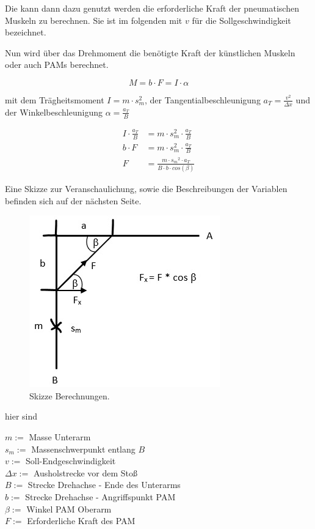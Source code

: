 Die kann dann dazu genutzt werden die erforderliche Kraft der pneumatischen Muskeln zu berechnen.
Sie ist im folgenden mit \(v\) für die Sollgeschwindigkeit bezeichnet. \par
Nun wird über das Drehmoment die benötigte Kraft der künstlichen Muskeln oder auch PAMs berechnet. 



\begin{equation}
	M = b \cdot F = I \cdot \alpha
	\label{eq:DrehmomentArm}
	\end{equation}
	
	mit dem Trägheitsmoment \( I = m \cdot s_m^2 \), der Tangentialbeschleunigung \( a_T = \frac{v^2}{\Delta x} \) und der
	Winkelbeschleunigung \( \alpha = \frac{a_T}{B} \) \par\medskip
	
	\begin{align}
	I \cdot \frac{a_T}{B} &= m \cdot s_m^2 \cdot \frac{a_T}{B} \nonumber\\
	b \cdot F &= m \cdot s_m^2 \cdot \frac{a_T}{B} \nonumber\\
	F &=\frac{m \cdot {s_m}^2 \cdot a_T}{B \cdot b \cdot cos(\beta)}
	\label{eq:Kraft-PAM}
	\end{align}

	Eine Skizze zur Veranschaulichung, sowie die Beschreibungen der Variablen befinden sich auf der nächsten Seite. 
	
	\newpage
	\begin{figure}[h]
		\centering
		\includegraphics[width=.5\textwidth]{Abb/SkizzeBerechnungen.jpeg}
		\caption{Skizze Berechnungen.}
		\label{fig:SkizzeBerechnungen}
	\end{figure}

	hier sind
	
	\( m := \) Masse Unterarm \\
	\( s_m := \) Massenschwerpunkt entlang $ B $ \\
	\( v := \) Soll-Endgeschwindigkeit \\
	\( \Delta x := \) Ausholstrecke vor dem Stoß \\
	\( B := \) Strecke Drehachse - Ende des Unterarms \\
	\( b:= \) Strecke Drehachse - Angriffspunkt PAM \\
	\( \beta := \) Winkel PAM  Oberarm \\
	\( F:= \) Erforderliche Kraft des PAM

